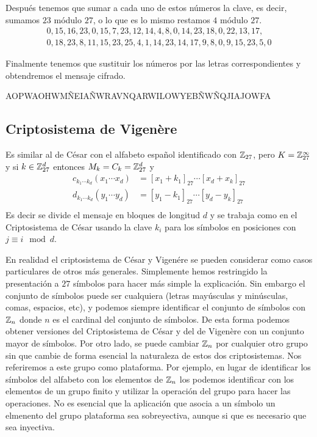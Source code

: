 Después tenemos que sumar a cada uno de estos números la clave, es decir, sumamos $23$ módulo $27$, o lo que es lo mismo restamos $4$ módulo $27$.
\begin{gather*}
    0, 15, 16, 23, 0, 15, 7, 23, 12, 14, 4, 8, 0, 14, 23, 18, 0, 22, 13, 17, \\ 0, 18, 23, 8, 11, 15, 23, 25, 4, 1, 14, 23, 14, 17, 9, 8, 0, 9, 15, 23, 5, 0
\end{gather*}

Finalmente tenemos que sustituir los números por las letras correspondientes y obtendremos el mensaje cifrado.

\begin{center}
    AOPWAOHWMÑEIAÑWRAVNQARWILOWYEBÑWÑQJIAJOWFA
\end{center}

\subsection*{Criptosistema de Vigenère}

Es similar al de César con el alfabeto español identificado con $\mathbb{Z}_{27}$, pero $K=\mathbb{Z}_{27}^\infty$ y si $k\in\mathbb{Z}_{27}^d$ entonces $M_k=C_k=\mathbb{Z}_{27}^d$ y
\begin{equation*}
    \begin{split}
        c_{k_1\cdots k_d}(x_1\cdots x_d) &= [x_1 + k_1]_{27}\cdots [x_d + x_k]_{27} \\
        d_{k_1\cdots k_d}(y_1\cdots y_d) &= [y_1 - k_1]_{27}\cdots [y_d - y_k]_{27} \\
    \end{split}
\end{equation*}
Es decir se divide el mensaje en bloques de longitud $d$ y se trabaja como en el Criptosistema de César usando la clave $k_i$ para los símbolos en posiciones con $j\equiv i \mod d$.

En realidad el criptosistema de César y Vigenére se pueden considerar como casos particulares de otros más generales. Simplemente hemos restringido la presentación a $27$ símbolos para hacer más simple la explicación. Sin embargo el conjunto de símbolos puede ser cualquiera (letras mayúsculas y minúsculas, comas, espacios, etc), y podemos siempre identificar el conjunto de símbolos con $\mathbb{Z}_n$ donde $n$ es el cardinal del conjunto de símbolos. De esta forma podemos obtener versiones del Criptosistema de César y del de Vigenère con un conjunto mayor de símbolos. Por otro lado, se puede cambiar $\mathbb{Z}_n$ por cualquier otro grupo sin que cambie de forma esencial la naturaleza de estos dos criptosistemas. Nos referiremos a este grupo como plataforma. Por ejemplo, en lugar de identificar los símbolos del alfabeto con los elementos de $\mathbb{Z}_n$ los podemos identificar con los elementos de un grupo finito y utilizar la operación del grupo para hacer las operaciones. No es esencial que la aplicación que asocia a un símbolo un elmenento del grupo plataforma sea sobreyectiva, aunque si que es necesario que sea inyectiva.

